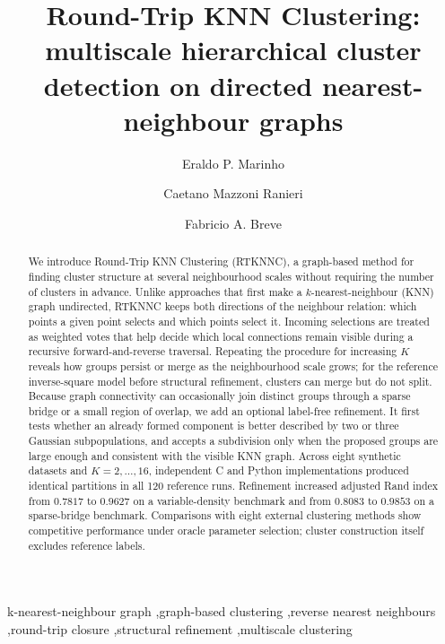 \documentclass[review,12pt]{elsarticle}
\begin{document}
\begin{frontmatter}

\title{Round-Trip KNN Clustering: multiscale hierarchical cluster detection on directed nearest-neighbour graphs}

\author[1]{Eraldo P. Marinho}
\author[1]{Caetano Mazzoni Ranieri}
\author[1]{Fabricio A. Breve}

\address[1]{Department of Statistics, Applied Mathematics and Computing,
S\~ao Paulo State University (UNESP), Institute of Geosciences and Exact Sciences,
Av. 24-A, 1515, Rio Claro, S\~ao Paulo, Brazil}

\begin{abstract}
We introduce Round-Trip KNN Clustering (RTKNNC), a graph-based method for
finding cluster structure at several neighbourhood scales without requiring the
number of clusters in advance. Unlike approaches that first make a
$k$-nearest-neighbour (KNN) graph undirected, RTKNNC keeps both directions of
the neighbour relation: which points a given point selects and which points
select it. Incoming selections are treated as weighted votes that help decide
which local connections remain visible during a recursive forward-and-reverse
traversal. Repeating the procedure for increasing $K$ reveals how groups persist
or merge as the neighbourhood scale grows; for the reference inverse-square
model before structural refinement, clusters can merge but do not split.
Because graph connectivity can occasionally join distinct groups through a
sparse bridge or a small region of overlap, we add an optional label-free
refinement. It first tests whether an already formed component is better
described by two or three Gaussian subpopulations, and accepts a subdivision
only when the proposed groups are large enough and consistent with the visible
KNN graph. Across eight synthetic datasets and $K=2,\ldots,16$, independent C
and Python implementations produced identical partitions in all 120 reference
runs. Refinement increased adjusted Rand index from $0.7817$ to $0.9627$ on a
variable-density benchmark and from $0.8083$ to $0.9853$ on a sparse-bridge
benchmark. Comparisons with eight external clustering methods show competitive
performance under oracle parameter selection; cluster construction itself
excludes reference labels.
\end{abstract}
\begin{keyword}
k-nearest-neighbour graph \sep graph-based clustering \sep reverse nearest neighbours \sep round-trip closure \sep structural refinement \sep multiscale clustering
\end{keyword}

\end{frontmatter}
\end{document}
